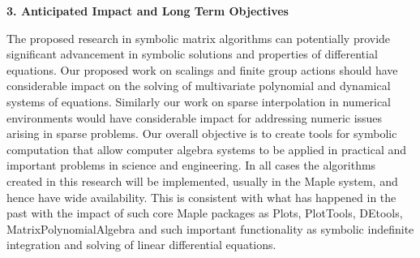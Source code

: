 \bigskip
\noindent
{\bf 3.   Anticipated Impact and Long Term Objectives}
\bigskip
  
The proposed research in symbolic matrix algorithms can potentially provide significant advancement in symbolic solutions and properties of differential equations. Our proposed work on scalings and finite group actions should have considerable impact on the solving of multivariate polynomial and dynamical systems of equations. Similarly our work on sparse interpolation in numerical environments would have considerable impact for 
addressing numeric issues arising in sparse problems. Our overall objective is to create tools for symbolic computation that allow computer algebra systems to be applied in practical and important problems in science and engineering. In all cases the algorithms created in this research will be implemented, usually in the Maple system, and hence have wide availability. This is consistent with what has happened in the past with the impact of such core Maple packages as Plots, PlotTools, DEtools, MatrixPolynomialAlgebra and such important functionality as symbolic indefinite integration and solving of linear differential equations.


